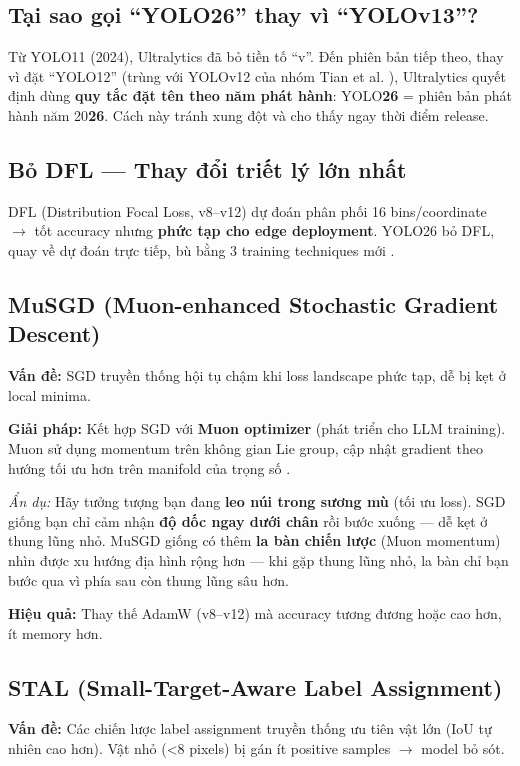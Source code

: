 \subsection{Tại sao gọi ``YOLO26'' thay vì ``YOLOv13''?}
Từ YOLO11 (2024), Ultralytics đã bỏ tiền tố ``v''. Đến phiên bản tiếp theo, thay vì đặt ``YOLO12'' (trùng với YOLOv12 của nhóm Tian et al. \cite{yolov12}), Ultralytics quyết định dùng \textbf{quy tắc đặt tên theo năm phát hành}: YOLO\textbf{26} = phiên bản phát hành năm 20\textbf{26}. Cách này tránh xung đột và cho thấy ngay thời điểm release.

\subsection{Bỏ DFL --- Thay đổi triết lý lớn nhất}
DFL (Distribution Focal Loss, v8--v12) dự đoán phân phối 16 bins/coordinate $\rightarrow$ tốt accuracy nhưng \textbf{phức tạp cho edge deployment}. YOLO26 bỏ DFL, quay về dự đoán trực tiếp, bù bằng 3 training techniques mới \cite{yolo26}.

\subsection{MuSGD (Muon-enhanced Stochastic Gradient Descent)}
\textbf{Vấn đề:} SGD truyền thống hội tụ chậm khi loss landscape phức tạp, dễ bị kẹt ở local minima.

\textbf{Giải pháp:} Kết hợp SGD với \textbf{Muon optimizer} (phát triển cho LLM training). Muon sử dụng momentum trên không gian Lie group, cập nhật gradient theo hướng tối ưu hơn trên manifold của trọng số \cite{yolo26}.

\textit{Ẩn dụ:} Hãy tưởng tượng bạn đang \textbf{leo núi trong sương mù} (tối ưu loss). SGD giống bạn chỉ cảm nhận \textbf{độ dốc ngay dưới chân} rồi bước xuống --- dễ kẹt ở thung lũng nhỏ. MuSGD giống có thêm \textbf{la bàn chiến lược} (Muon momentum) nhìn được xu hướng địa hình rộng hơn --- khi gặp thung lũng nhỏ, la bàn chỉ bạn bước qua vì phía sau còn thung lũng sâu hơn.

\textbf{Hiệu quả:} Thay thế AdamW (v8--v12) mà accuracy tương đương hoặc cao hơn, ít memory hơn.

\subsection{STAL (Small-Target-Aware Label Assignment)}
\textbf{Vấn đề:} Các chiến lược label assignment truyền thống ưu tiên vật lớn (IoU tự nhiên cao hơn). Vật nhỏ (<8 pixels) bị gán ít positive samples $\rightarrow$ model bỏ sót.

